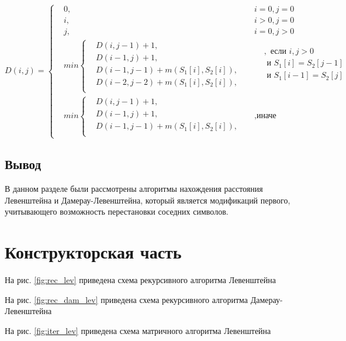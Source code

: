 \documentclass[12pt]{report}
\begin{document}
\[ D(i, j) =  \left\{
	\begin{aligned}
		  & 0, &   & i = 0, j = 0 \\
		  & i, &   & i > 0, j = 0 \\
		  & j, &   & i = 0, j > 0 \\		    	
		&min \left\{
		\begin{aligned}
		&D(i, j - 1) + 1,\\
		&D(i - 1, j) + 1,\\
		&D(i - 1, j - 1) + m(S_{1}[i], S_{2}[i]), \\
		&D(i - 2, j - 2) + m(S_{1}[i], S_{2}[i]),\\
	\end{aligned} \right.
	&& 
	\begin{aligned}
		  & , \text{ если } i, j > 0         \\
		  & \text{ и } S_{1}[i] = S_{2}[j - 1]  \\
		  & \text{ и } S_{1}[i - 1] =  S_{2}[j] \\
	\end{aligned} \\ 
	&min \left\{
	\begin{aligned}
		  & D(i, j - 1) + 1,                         \\
		  & D(i - 1, j) + 1,                         \\
		  & D(i - 1, j - 1) + m(S_{1}[i], S_{2}[i]), \\
	\end{aligned} \right.  &&, \text{иначе}
	\end{aligned} \right.
\]	
	    
\section{Вывод}
В данном разделе были рассмотрены алгоритмы нахождения расстояния Левенштейна и Дамерау-Левенштейна, который является модификаций первого, учитывающего возможность перестановки соседних символов. 
		
\chapter{Конструкторская часть}
На рис. \ref{fig:rec_lev} приведена схема рекурсивного алгоритма Левенштейна

На рис. \ref{fig:rec_dam_lev} приведена схема рекурсивного алгоритма Дамерау-Левенштейна

На рис. \ref{fig:iter_lev} приведена схема матричного алгоритма Левенштейна
\end{document}
